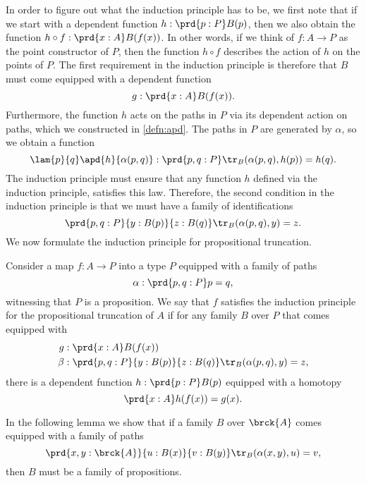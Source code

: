 In order to figure out what the induction principle has to be, we first note that if we start with a dependent function $h:\prd{p:P}B(p)$, then we also obtain the function $h\circ f : \prd{x:A}B(f(x))$. In other words, if we think of $f:A\to P$ as the point constructor of $P$, then the function $h\circ f$ describes the action of $h$ on the points of $P$. The first requirement in the induction principle is therefore that $B$ must come equipped with a dependent function
\begin{equation*}
  g:\prd{x:A}B(f(x)).
\end{equation*}
Furthermore, the function $h$ acts on the paths in $P$ via its dependent action on paths, which we constructed in \cref{defn:apd}. The paths in $P$ are generated by $\alpha$, so we obtain a function
\begin{equation*}
  \lam{p}{q}\apd{h}{\alpha(p,q)} : \prd{p,q:P} \tr_B(\alpha(p,q),h(p))=h(q).
\end{equation*}
The induction principle must ensure that any function $h$ defined via the induction principle, satisfies this law. Therefore, the second condition in the induction principle is that we must have a family of identifications
\begin{equation*}
  \prd{p,q:P}{y:B(p)}{z:B(q)}\tr_B(\alpha(p,q),y)= z.
\end{equation*}
We now formulate the induction principle for propositional truncation.

\begin{defn}
  Consider a map $f:A\to P$ into a type $P$ equipped with a family of paths
  \begin{equation*}
    \alpha : \prd{p,q:P}p=q,
  \end{equation*}
  witnessing that $P$ is a proposition. We say that $f$ satisfies the induction principle for the propositional truncation of $A$ if for any family $B$ over $P$ that comes equipped with
  \begin{align*}
    g & : \prd{x:A}B(f(x)) \\
    \beta & : \prd{p,q:P}{y:B(p)}{z:B(q)}\tr_B(\alpha(p,q),y)=z,
  \end{align*}
  there is a dependent function $h:\prd{p:P}B(p)$ equipped with a homotopy
  \begin{equation*}
    \prd{x:A}h(f(x))= g(x).
  \end{equation*}
\end{defn}

In the following lemma we show that if a family $B$ over $\brck{A}$ comes equipped with a family of paths
\begin{equation*}
  \prd{x,y:\brck{A}}{u:B(x)}{v:B(y)}\tr_B(\alpha(x,y),u)=v,
\end{equation*}
then $B$ must be a family of propositions.

